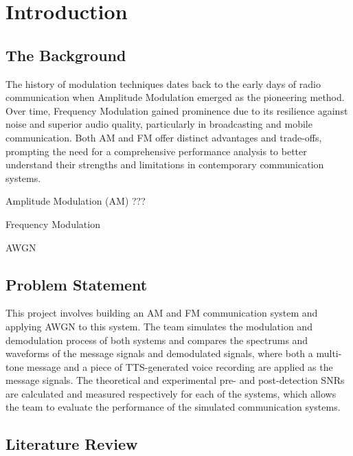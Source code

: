 \documentclass[../ECE459FinalProjectReport.tex]{subfiles}
\begin{document}
\chapter{Introduction}
\section{The Background}
The history of modulation techniques dates back to the early days of radio communication when Amplitude Modulation emerged as the pioneering method. Over time, Frequency Modulation gained prominence due to its resilience against noise and superior audio quality, particularly in broadcasting and mobile communication. Both AM and FM offer distinct advantages and trade-offs, prompting the need for a comprehensive performance analysis to better understand their strengths and limitations in contemporary communication systems.

Amplitude Modulation (AM) ??? %

Frequency Modulation 

AWGN %

\section{Problem Statement}
This project involves building an AM and FM communication system and applying AWGN to this system. The team simulates the modulation and demodulation process of both systems and compares the spectrums and waveforms of the message signals and demodulated signals, where both a multi-tone message and a piece of TTS-generated voice recording are applied as the message signals. The theoretical and experimental pre- and post-detection SNRs are calculated and measured respectively for each of the systems, which allows the team to evaluate the performance of the simulated communication systems.


\section{Literature Review}
\end{document}
